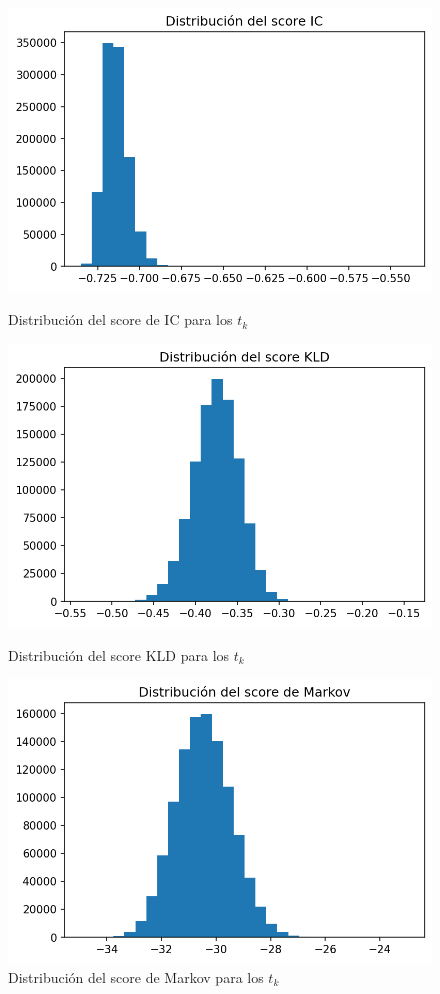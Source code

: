\documentclass[a4paper,10pt]{article}
\begin{document}
\begin{figure}[!htb]
  \includegraphics[width=\linewidth]{ic.png}
  \caption{Distribución del score de IC para los $t_k$}
\endminipage\hfill
{}
  \includegraphics[width=\linewidth]{kld.png}
  \caption{Distribución del score KLD para los $t_k$}
\endminipage\hfill
{}%
  \includegraphics[width=\linewidth]{markov.png}
  \caption{Distribución del score de Markov para los $t_k$}
\endminipage
\end{figure}
\end{document}
